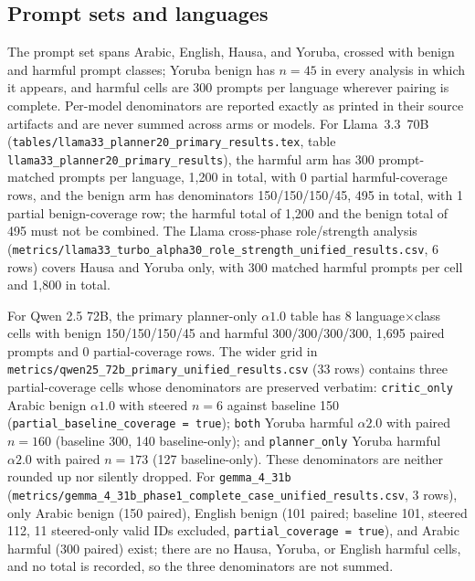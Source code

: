 \subsection{Prompt sets and languages}

The prompt set spans Arabic, English, Hausa, and Yoruba, crossed with benign and
harmful prompt classes; Yoruba benign has $n = 45$ in every analysis in which it
appears, and harmful cells are 300 prompts per language wherever pairing is
complete. Per-model denominators are reported exactly as printed in their source
artifacts and are never summed across arms or models. For Llama~3.3~70B
(\texttt{tables/llama33\_planner20\_primary\_results.tex}, table
\texttt{llama33\_planner20\_primary\_results}), the harmful arm has 300
prompt-matched prompts per language, 1{,}200 in total, with 0 partial
harmful-coverage rows, and the benign arm has denominators 150/150/150/45,
495 in total, with 1 partial benign-coverage row; the harmful total of 1{,}200
and the benign total of 495 must not be combined. The Llama cross-phase
role/strength analysis
(\texttt{metrics/llama33\_turbo\_alpha30\_role\_strength\_unified\_results.csv},
6 rows) covers Hausa and Yoruba only, with 300 matched harmful prompts per cell
and 1{,}800 in total.

For Qwen 2.5 72B, the primary planner-only $\alpha1.0$ table has 8
language$\times$class cells with benign 150/150/150/45 and harmful
300/300/300/300, 1{,}695 paired prompts and 0 partial-coverage rows. The wider
grid in \texttt{metrics/qwen25\_72b\_primary\_unified\_results.csv} (33 rows)
contains three partial-coverage cells whose denominators are preserved verbatim:
\texttt{critic\_only} Arabic benign $\alpha1.0$ with steered $n = 6$ against
baseline 150 (\texttt{partial\_baseline\_coverage = true}); \texttt{both} Yoruba
harmful $\alpha2.0$ with paired $n = 160$ (baseline 300, 140 baseline-only); and
\texttt{planner\_only} Yoruba harmful $\alpha2.0$ with paired $n = 173$ (127
baseline-only). These denominators are neither rounded up nor silently dropped.
For \texttt{gemma\_4\_31b}
(\texttt{metrics/gemma\_4\_31b\_phase1\_complete\_case\_unified\_results.csv},
3 rows), only Arabic benign (150 paired), English benign (101 paired; baseline
101, steered 112, 11 steered-only valid IDs excluded,
\texttt{partial\_coverage = true}), and Arabic harmful (300 paired) exist; there
are no Hausa, Yoruba, or English harmful cells, and no total is recorded, so the
three denominators are not summed.

